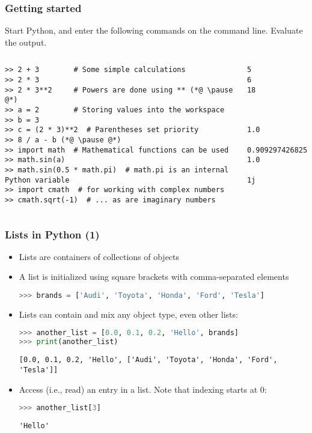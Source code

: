 \begin{frame}[fragile]
  \frametitle{Getting started}
   Start Python, and enter the following commands on the command line. Evaluate the output.
   \pause
   \begin{columns}
      \begin{lstlisting}[numbers=none]
>> 2 + 3        # Some simple calculations
>> 2 * 3
>> 2 * 3**2     # Powers are done using ** (*@ \pause @*)
>> a = 2        # Storing values into the workspace
>> b = 3
>> c = (2 * 3)**2  # Parentheses set priority
>> 8 / a - b (*@ \pause @*)
>> import math  # Mathematical functions can be used 
>> math.sin(a)  
>> math.sin(0.5 * math.pi)  # math.pi is an internal Python variable
>> import cmath  # for working with complex numbers
>> cmath.sqrt(-1)  # ... as are imaginary numbers    
      \end{lstlisting}\pause
      \begin{lstlisting}[style=PyOutput,numbers=none]
5
6
18



1.0

0.9092974268256817
1.0

1j
      \end{lstlisting}
  \end{columns}
 \end{frame}
 
\begin{frame}[fragile]
  \frametitle{Lists in Python (1)}
  \begin{itemize}
    \item Lists are containers of collections of objects
    \item A list is initialized using square brackets with comma-separated elements
    \begin{lstlisting}[language=Python,numbers=none]
>>> brands = ['Audi', 'Toyota', 'Honda', 'Ford', 'Tesla']
    \end{lstlisting}
    \item Lists can contain and mix any object type, even other lists:
    \begin{lstlisting}[language=Python,numbers=none]
>>> another_list = [0.0, 0.1, 0.2, 'Hello', brands]
>>> print(another_list)
    \end{lstlisting}
    \begin{lstlisting}[style=PyOutput]
[0.0, 0.1, 0.2, 'Hello', ['Audi', 'Toyota', 'Honda', 'Ford', 'Tesla']]
    \end{lstlisting}
    \item Access (i.e., read) an entry in a list. Note that indexing starts at 0:
    \begin{lstlisting}[language=Python,numbers=none]
>>> another_list[3]
    \end{lstlisting}
    \begin{lstlisting}[style=PyOutput]
'Hello'
    \end{lstlisting}
  \end{itemize}
 \end{frame}
 
